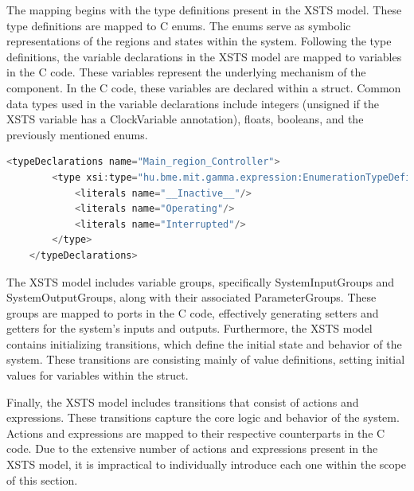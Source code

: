 The mapping begins with the type definitions present in the XSTS model. These type definitions are mapped to C enums. The enums serve as symbolic representations of the regions and states within the system. Following the type definitions, the variable declarations in the XSTS model are mapped to variables in the C code. These variables represent the underlying mechanism of the component. In the C code, these variables are declared within a struct. Common data types used in the variable declarations include integers (unsigned if the XSTS variable has a ClockVariable annotation), floats, booleans, and the previously mentioned enums.
\bigskip

\begin{lstlisting}[language=C, caption={Representation of regions in XSTS}]
	<typeDeclarations name="Main_region_Controller">
		<type xsi:type="hu.bme.mit.gamma.expression:EnumerationTypeDefinition">
			<literals name="__Inactive__"/>
			<literals name="Operating"/>
			<literals name="Interrupted"/>
		</type>
	</typeDeclarations>
\end{lstlisting}

The XSTS model includes variable groups, specifically SystemInputGroups and SystemOutputGroups, along with their associated ParameterGroups. These groups are mapped to ports in the C code, effectively generating setters and getters for the system's inputs and outputs. Furthermore, the XSTS model contains initializing transitions, which define the initial state and behavior of the system. These transitions are consisting mainly of value definitions, setting initial values for variables within the struct.

Finally, the XSTS model includes transitions that consist of actions and expressions. These transitions capture the core logic and behavior of the system. Actions and expressions are mapped to their respective counterparts in the C code. Due to the extensive number of actions and expressions present in the XSTS model, it is impractical to individually introduce each one within the scope of this section.

